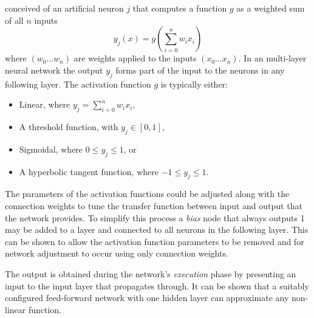  conceived of an artificial neuron $j$ that
computes a function $g$ as a weighted sum of all $n$ inputs
\begin{equation}
y_j(x) = g \left(\sum_{i=0}^n w_ix_i\right)
\end{equation}
where $(w_0 \dotsc w_n)$ are weights applied to the inputs $(x_0 \dotsc x_n)$.
In an multi-layer neural network the output $y_j$ forms part of the input
to the neurons in any following layer.  The activation function $g$ is
typically either:
\begin{itemize}
  \item Linear, where $y_j = \sum_{i=0}^n w_ix_i$,
  \item A threshold function, with $y_j \in [0,1]$,
  \item Sigmoidal, where $0 \leq y_j \leq 1$, or
  \item A hyperbolic tangent function, where $-1 \leq y_j \leq 1$.
\end{itemize}
The parameters of the activation functions could be adjusted along with the
connection weights to tune the transfer function between input and output that
the network provides.  To simplify this process a \textit{bias} node that always outputs 1
may be added to a layer and connected to all neurons in the following layer.
This can be shown to allow the activation function parameters to be removed and
for network adjustment to occur using only connection weights.

The output is obtained during the network's \textit{execution} phase by
presenting an input to the input layer that propagates through.  It can be
shown that a suitably configured feed-forward network with one hidden layer can
approximate any non-linear function.

